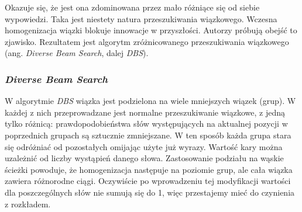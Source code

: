 Okazuje się, że jest ona zdominowana przez mało różniące się od siebie wypowiedzi. Taka jest niestety natura przeszukiwania wiązkowego. Wczesna homogenizacja wiązki blokuje innowacje w przyszłości. Autorzy \cite{dbs} próbują obejść to zjawisko. Rezultatem jest algorytm zróżnicowanego przeszukiwania wiązkowego (ang. \textit{Diverse Beam Search}, dalej \textit{DBS}).

\subsubsection{\textit{Diverse Beam Search}}

W algorytmie \textit{DBS} wiązka jest podzielona na wiele mniejszych wiązek (grup). W każdej z nich przeprowadzane jest normalne przeszukiwanie wiązkowe, z jedną tylko różnicą: prawdopodobieństwa słów występujących na aktualnej pozycji w poprzednich grupach są sztucznie zmniejszane. W ten sposób każda grupa stara się odróżniać od pozostałych omijając użyte już wyrazy. Wartość kary można uzależnić od liczby wystąpień danego słowa. Zastosowanie podziału na wąskie ścieżki powoduje, że homogenizacja następuje na poziomie grup, ale cała wiązka zawiera różnorodne ciągi. Oczywiście po wprowadzeniu tej modyfikacji wartości dla poszczególnych słów nie sumują się do 1, więc przestajemy mieć do czynienia z rozkładem.

